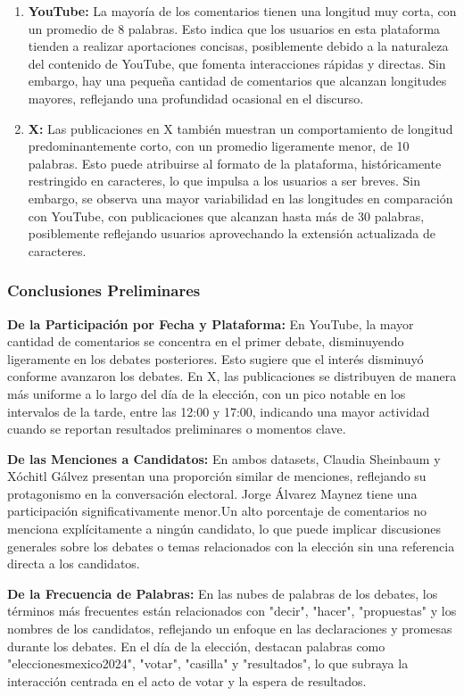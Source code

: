 \documentclass[10pt, a4paper]{article}
\begin{document}
	\begin{enumerate}
		\item \textbf{YouTube:} La mayoría de los comentarios tienen una longitud muy corta, con un promedio de 8 palabras. Esto indica que los usuarios en esta plataforma tienden a realizar aportaciones concisas, posiblemente debido a la naturaleza del contenido de YouTube, que fomenta interacciones rápidas y directas. Sin embargo, hay una pequeña cantidad de comentarios que alcanzan longitudes mayores, reflejando una profundidad ocasional en el discurso.
		
		\item \textbf{X:} Las publicaciones en X también muestran un comportamiento de longitud predominantemente corto, con un promedio ligeramente menor, de 10 palabras. Esto puede atribuirse al formato de la plataforma, históricamente restringido en caracteres, lo que impulsa a los usuarios a ser breves. Sin embargo, se observa una mayor variabilidad en las longitudes en comparación con YouTube, con publicaciones que alcanzan hasta más de 30 palabras, posiblemente reflejando usuarios aprovechando la extensión actualizada de caracteres.
	\end{enumerate}
	
	\subsubsection{Conclusiones Preliminares}
	\textbf{De la Participación por Fecha y Plataforma:} En YouTube, la mayor cantidad de comentarios se concentra en el primer debate, disminuyendo ligeramente en los debates posteriores. Esto sugiere que el interés disminuyó conforme avanzaron los debates. En X, las publicaciones se distribuyen de manera más uniforme a lo largo del día de la elección, con un pico notable en los intervalos de la tarde, entre las 12:00 y 17:00, indicando una mayor actividad cuando se reportan resultados preliminares o momentos clave.
	
	\textbf{De las Menciones a Candidatos:} En ambos datasets, Claudia Sheinbaum y Xóchitl Gálvez presentan una proporción similar de menciones, reflejando su protagonismo en la conversación electoral. Jorge Álvarez Maynez tiene una participación significativamente menor.Un alto porcentaje de comentarios no menciona explícitamente a ningún candidato, lo que puede implicar discusiones generales sobre los debates o temas relacionados con la elección sin una referencia directa a los candidatos.
	
	\textbf{De la Frecuencia de Palabras:} En las nubes de palabras de los debates, los términos más frecuentes están relacionados con "decir", "hacer", "propuestas" y los nombres de los candidatos, reflejando un enfoque en las declaraciones y promesas durante los debates. En el día de la elección, destacan palabras como "eleccionesmexico2024", "votar", "casilla" y "resultados", lo que subraya la interacción centrada en el acto de votar y la espera de resultados.
	
\end{document}
